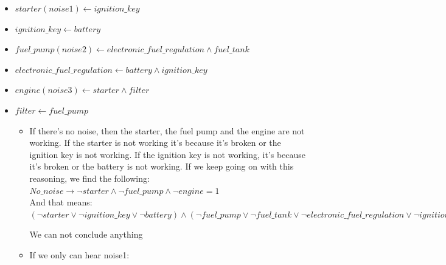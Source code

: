 \documentclass[paper=a4, fontsize=11pt]{scrartcl} %
\numberwithin{equation}{section} %
\numberwithin{figure}{section} %
\numberwithin{table}{section} %
\begin{document}
\begin{itemize}

	\item $ starter(noise1) \leftarrow ignition\_key $
	\item $ ignition\_key \leftarrow battery $
	
	\item $ fuel\_pump(noise2) \leftarrow electronic\_fuel\_regulation \land fuel\_tank $					
	\item $ electronic\_fuel\_regulation \leftarrow battery \land ignition\_key $
			

	\item $ engine(noise3) \leftarrow starter \land filter $
	\item $ filter \leftarrow fuel\_pump $
	
	
	\begin{itemize}		
		\item If there's no noise, then the starter, the fuel pump and the engine are not working. If the starter is not working it's because it's broken or the ignition key is not working. If the ignition key is not working, it's because it's broken or the battery is not working. If we keep going on with this reasoning, we find the following:\\
		
		$ No\_noise \rightarrow \lnot starter \land \lnot fuel\_pump \land \lnot engine = 1 $\\
		
		And that means: \\
		
		$ (\lnot starter \lor \lnot ignition\_key \lor \lnot battery) \land (\lnot fuel\_pump \lor \lnot fuel\_tank \lor \lnot electronic\_fuel\_regulation \lor \lnot ignition\_key \lor \lnot battery) \land (\lnot engine \lor \lnot filter \lor \lnot fuel\_pump \lor \lnot fuel\_tank \lor \lnot electronic\_fuel\_regulation \lor \lnot ignition\_key \lor \lnot battery \lor \lnot starter \lor \lnot ignition\_key \lor \lnot battery) = 1 $
		
			
		We can not conclude anything
		
\newpage
		
		
		
		
		\item If we only can hear noise1:
		

\end{itemize}
\end{itemize}
\end{document}
